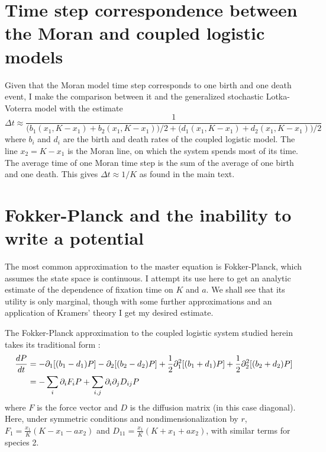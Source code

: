 

\section*{Time step correspondence between the Moran and coupled logistic models}%
Given that the Moran model time step corresponds to one birth and one death event, I make the comparison between it and the generalized stochastic Lotka-Voterra model with the estimate 
\begin{equation}
\Delta t \approx \frac{1}{\big(b_1\left(x_1,K-x_1\right)+b_2\left(x_1,K-x_1\right)\big)/2+\big(d_1\left(x_1,K-x_1\right)+d_2\left(x_1,K-x_1\right)\big)/2}
\end{equation}
where $b_i$ and $d_i$ are the birth and death rates of the coupled logistic model. 
The line $x_2=K-x_1$ is the Moran line, on which the system spends most of its time. 
The average time of one Moran time step is the sum of the average of one birth and one death. 
This gives $\Delta t \approx 1/K$ as found in the main text. 


\section*{Fokker-Planck and the inability to write a potential}
The most common approximation to the master equation is Fokker-Planck, which assumes the state space is continuous. 
I attempt its use here to get an analytic estimate of the dependence of fixation time on $K$ and $a$. 
We shall see that its utility is only marginal, though with some further approximations and an application of Kramers' theory I get my desired estimate. 

The Fokker-Planck approximation to the coupled logistic system studied herein takes its traditional form \cite{Nisbet1982}:
\begin{align}
\frac{dP}{dt} &= - \partial_1[(b_1-d_1)P] - \partial_2[(b_2-d_2)P] + \frac{1}{2}\partial_1^2[(b_1+d_1)P] + \frac{1}{2}\partial_2^2[(b_2+d_2)P] \notag \\
&= -\sum_{i} \partial_i F_iP + \sum_{i,j} \partial_i\partial_j D_{ij}P
\end{align}%
where $F$ is the force vector and $D$ is the diffusion matrix (in this case diagonal). 
Here, under symmetric conditions and nondimensionalization by $r$, $F_1 = \frac{x_1}{K}(K - x_1 - a x_2)$ and $D_{11} = \frac{x_1}{K}(K + x_1 + a x_2)$, with similar terms for species 2. 


